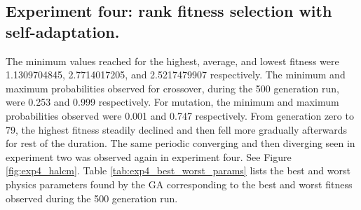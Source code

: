 

\newpage

\subsection[Experiment Four]{Experiment four: rank fitness selection with self-adaptation.}

The minimum values reached for the highest, average, and lowest fitness were 1.1309704845, 2.7714017205, and 2.5217479907 respectively. The minimum and maximum probabilities observed for crossover, during the 500 generation run, were 0.253 and 0.999 respectively. For mutation, the minimum and maximum probabilities observed were 0.001 and 0.747 respectively. From generation zero to 79, the highest fitness steadily declined and then fell more gradually afterwards for rest of the duration. The same periodic converging and then diverging seen in experiment two was observed again in experiment four. See Figure \ref{fig:exp4_halcm}. Table \ref{tab:exp4_best_worst_params} lists the best and worst physics parameters found by the GA corresponding to the best and worst fitness observed during the 500 generation run.

